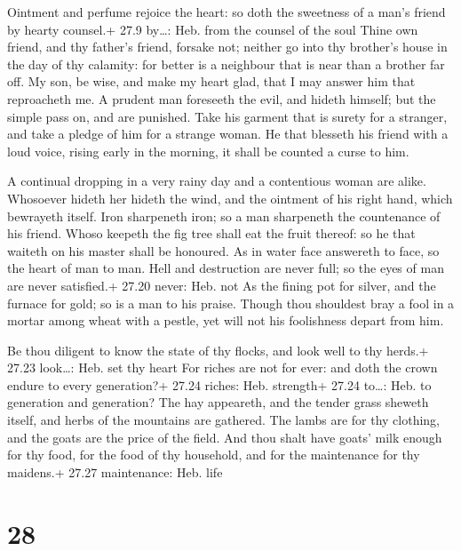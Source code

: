  Ointment and perfume rejoice the heart: so doth the
sweetness of a man's friend by hearty counsel.+ 27.9 by\ldots: Heb. from
the counsel of the soul  Thine own friend, and thy father's
friend, forsake not; neither go into thy brother's house in the day of
thy calamity: for better is a neighbour that is near than a brother far
off.  My son, be wise, and make my heart glad, that I may
answer him that reproacheth me.  A prudent man foreseeth
the evil, and hideth himself; but the simple pass on, and are punished.
 Take his garment that is surety for a stranger, and take a
pledge of him for a strange woman.  He that blesseth his
friend with a loud voice, rising early in the morning, it shall be
counted a curse to him.

 A continual dropping in a very rainy day and a contentious
woman are alike.  Whosoever hideth her hideth the wind, and
the ointment of his right hand, which bewrayeth itself. 
Iron sharpeneth iron; so a man sharpeneth the countenance of his friend.
 Whoso keepeth the fig tree shall eat the fruit thereof: so
he that waiteth on his master shall be honoured.  As in
water face answereth to face, so the heart of man to man. 
Hell and destruction are never full; so the eyes of man are never
satisfied.+ 27.20 never: Heb. not  As the fining pot for
silver, and the furnace for gold; so is a man to his praise.
 Though thou shouldest bray a fool in a mortar among wheat
with a pestle, yet will not his foolishness depart from him.

 Be thou diligent to know the state of thy flocks, and look
well to thy herds.+ 27.23 look\ldots: Heb. set thy heart 
For riches are not for ever: and doth the crown endure to every
generation?+ 27.24 riches: Heb. strength+ 27.24 to\ldots: Heb. to
generation and generation?  The hay appeareth, and the
tender grass sheweth itself, and herbs of the mountains are gathered.
 The lambs are for thy clothing, and the goats are the
price of the field.  And thou shalt have goats' milk enough
for thy food, for the food of thy household, and for the maintenance for
thy maidens.+ 27.27 maintenance: Heb. life

\hypertarget{section-27}{%
\section{28}\label{section-27}}

